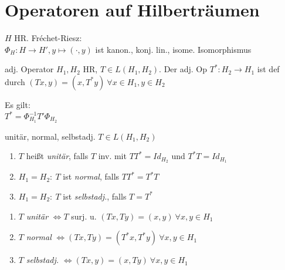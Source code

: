 
\section{Operatoren auf Hilberträumen}

\begin{bemerkung}
    \(H\) HR.
    Fréchet-Riesz:\\
    \(\Phi_H:H\to H', y\mapsto (\cdot,y)\) ist kanon., konj. lin., isome.
    Isomorphismus
\end{bemerkung}

\begin{definition}{adj. Operator}
    \(H_1, H_2\) HR, \(T \in L(H_1,H_2)\). Der adj. Op \(T^*:H_2\to H_1\) ist
    def durch \((Tx,y) = (x,T^*y)\ \forall x\in H_1, y\in H_2\)
\end{definition}

\begin{bemerkung}
    Es gilt:\\
    \(T^* = \Phi_{H_1}^{-1}T'\Phi_{H_2}\)
\end{bemerkung}

\begin{definition}{unitär, normal, selbstadj.}
    \(T\in L(H_1,H_2)\)
    \begin{enumerate}[label=(\roman*)]
        \item \(T\) heißt \textit{unitär}, falls \(T\) inv. mit 
            \(TT^*=Id_{H_2}\) und \(T^*T = Id_{H_1}\)
        \item \(H_1 = H_2:\ T\) ist \textit{normal}, falls \(TT^* = T^*T\)
        \item \(H_1 = H_2:\ T\) ist \textit{selbstadj.}, falls \(T=T^*\)
    \end{enumerate}
\end{definition}

\begin{bemerkung}
    \begin{enumerate}
        \item \(T\) \textit{unitär} \(\Leftrightarrow T\) surj. u.
            \((Tx,Ty) = (x,y)\ \forall x,y\in H_1\)
        \item \(T\) \textit{normal} \(\Leftrightarrow (Tx,Ty) = (T^*x,T^*y) 
            \ \forall x,y\in H_1\)
        \item \(T\) \textit{selbstadj.} \(\Leftrightarrow (Tx,y) = (x,Ty) 
            \ \forall x,y\in H_1\)
    \end{enumerate}
\end{bemerkung}

